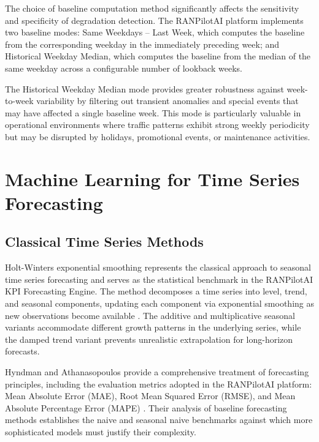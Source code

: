 The choice of baseline computation method significantly affects the sensitivity and specificity of degradation detection. The RANPilotAI platform implements two baseline modes: Same Weekdays -- Last Week, which computes the baseline from the corresponding weekday in the immediately preceding week; and Historical Weekday Median, which computes the baseline from the median of the same weekday across a configurable number of lookback weeks.

The Historical Weekday Median mode provides greater robustness against week-to-week variability by filtering out transient anomalies and special events that may have affected a single baseline week. This mode is particularly valuable in operational environments where traffic patterns exhibit strong weekly periodicity but may be disrupted by holidays, promotional events, or maintenance activities.

\section{Machine Learning for Time Series Forecasting}

\subsection{Classical Time Series Methods}

Holt-Winters exponential smoothing represents the classical approach to seasonal time series forecasting and serves as the statistical benchmark in the RANPilotAI KPI Forecasting Engine. The method decomposes a time series into level, trend, and seasonal components, updating each component via exponential smoothing as new observations become available \cite{hyndman2018}. The additive and multiplicative seasonal variants accommodate different growth patterns in the underlying series, while the damped trend variant prevents unrealistic extrapolation for long-horizon forecasts.

Hyndman and Athanasopoulos provide a comprehensive treatment of forecasting principles, including the evaluation metrics adopted in the RANPilotAI platform: Mean Absolute Error (MAE), Root Mean Squared Error (RMSE), and Mean Absolute Percentage Error (MAPE) \cite{hyndman2018}. Their analysis of baseline forecasting methods establishes the naive and seasonal naive benchmarks against which more sophisticated models must justify their complexity.

